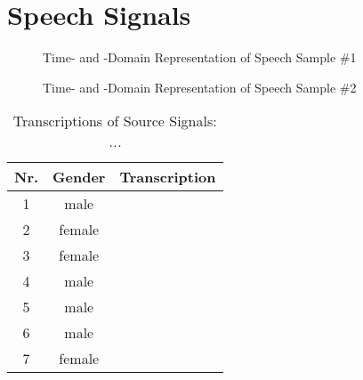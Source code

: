 \section*{Speech Signals}


\begin{figure}[H]
\iftoggle{quick}{
    \texttt{[image: plots/signals/s1-time-stft-scr]}
}{%
\setlength{\figureheight}{3cm}
\setlength{\figurewidth}{0.9\textwidth}
\footnotesize
 \begin{subfigure}{\textwidth}
    \centering
    
    \caption{Time-Domain Representation}
 \end{subfigure}\\
 \begin{subfigure}{\textwidth}
    \centering
    
    \caption{STFT-Domain Representation}
 \end{subfigure}
}%
 \caption{Time- and -Domain Representation of Speech Sample \#1}
\end{figure}

\begin{figure}[H]
\iftoggle{quick}{
    \texttt{[image: plots/signals/s2-time-stft-scr]}
}{%
\setlength{\figureheight}{3cm}
\setlength{\figurewidth}{0.9\textwidth}
\footnotesize
 \begin{subfigure}{\textwidth}
 \centering
 
    \caption{Time-Domain Representation}
 \end{subfigure}\\
 \begin{subfigure}{\textwidth}
 \centering
    
    \caption{STFT-Domain Representation}
 \end{subfigure}
}
 \caption{Time- and -Domain Representation of Speech Sample \#2}
 \label{fig:signalRepresentation}
\end{figure}


\begin{table}[htb]
	\small
	\begin{tabularx}{\textwidth}{ccX}
		\toprule
		Nr. & Gender & Transcription                                       \\
		\midrule
		1   & male   &            \\
		2   & female &            \\
		3   & female &            \\
		4   & male   &            \\
		5   & male   &            \\
		6   & male   &            \\
		7   & female & \itshape{} \\
		\bottomrule
	\end{tabularx}
	\caption[Transcriptions of Source Signals]{Transcriptions of Source Signals: \itshape ...}
	\label{table:source-signals}
\end{table}